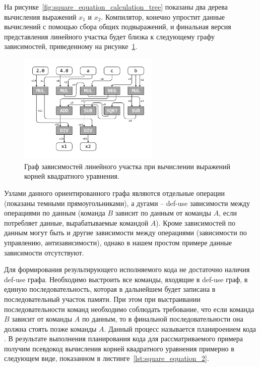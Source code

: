 \documentclass[
11pt,%
tightenlines,%
twoside,%
onecolumn,%
nofloats,%
nobibnotes,%
nofootinbib,%
superscriptaddress,%
noshowpacs,%
centertags]%
{revtex4}
\begin{document}
На рисунке~\ref{fig:square_equation_calculation_tree} показаны два дерева вычисления выражений $x_1$ и $x_2$.
Компилятор, конечно упростит данные вычислений с помощью сбора общих подвыражений, и финальная версия представления линейного участка будет близка к следующему графу зависимостей, приведенному на рисунке~\ref{fig:def_use}.

\begin{figure}[h]
\setcaptionmargin{5mm}
\onelinecaptionsfalse %
\includegraphics[width=0.60\textwidth]{pics/def_use.pdf}
\caption{Граф зависимостей линейного участка при вычислении выражений\\ корней квадратного уравнения.}\label{fig:def_use}
\end{figure}

Узлами данного ориентированного графа являются отдельные операции (показаны темными прямоугольниками), а дугами -- def-use зависимости между операциями по данным (команда $B$ зависит по данным от команды $A$, если потребляет данные, вырабатываемые командой $A$).
Кроме зависимостей по данным могут быть и другие зависимости между операциями (зависимости по управлению, антизависимости), однако в нашем простом примере данные зависимости отсутствуют.

Для формирования результирующего исполняемого кода не достаточно наличия def-use графа.
Необходимо выстроить все команды, входящие в def-use граф, в единую последовательность, которая в дальнейшем будет записана в последовательный участок памяти.
При этом при выстраивании последовательности команд необходимо соблюдать требование, что если команда $B$ зависит от команды $A$ по данным, то в финальной последовательности она должна стоять позже команды $A$.
Данный процесс называется планироением кода \cite{Aho}.
В результате выполнения планирования кода для рассматриваемого примера получим псевдокод вычисления корней квадратного уравнения примерно в следующем виде, показанном в листинге~\ref{lst:square_equation_2}.
\end{document}
